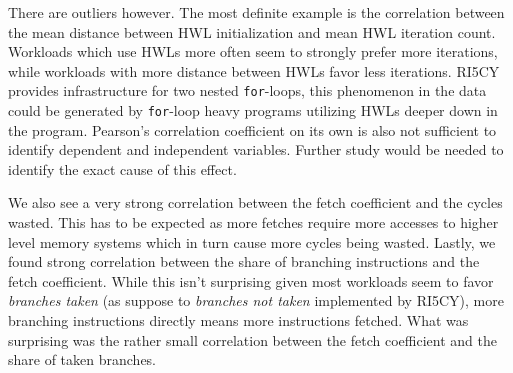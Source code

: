 \documentclass[../bachelor_paper.tex]{subfiles}
\begin{document}
There are outliers however. The most definite example is the correlation between the mean distance between \ac{HWL} initialization and mean \ac{HWL} iteration count. Workloads which use \acp{HWL} more often seem to strongly prefer more iterations, while workloads with more distance between \acp{HWL} favor less iterations. RI5CY provides infrastructure for two nested \texttt{for}-loops, this phenomenon in the data could be generated by \texttt{for}-loop heavy programs utilizing \acp{HWL} deeper down in the program. Pearson's correlation coefficient on its own is also not sufficient to identify dependent and independent variables. Further study would be needed to identify the exact cause of this effect. 

We also see a very strong correlation between the fetch coefficient and the cycles wasted. This has to be expected as more fetches require more accesses to higher level memory systems which in turn cause more cycles being wasted. Lastly, we found strong correlation between the share of branching instructions and the fetch coefficient. While this isn't surprising given most workloads seem to favor \emph{branches taken} (as suppose to \emph{branches not taken} implemented by RI5CY), more branching instructions directly means more instructions fetched. What was surprising was the rather small correlation between the fetch coefficient and the share of taken branches.
\end{document}
